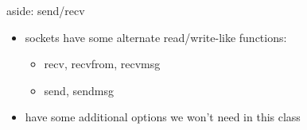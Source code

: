

\begin{frame}{aside: send/recv}
    \begin{itemize}
    \item sockets have some alternate read/write-like functions:
        \begin{itemize}
        \item recv, recvfrom, recvmsg
        \item send, sendmsg
        \end{itemize}
    \item have some additional options we won't need in this class
    \end{itemize}
\end{frame}
